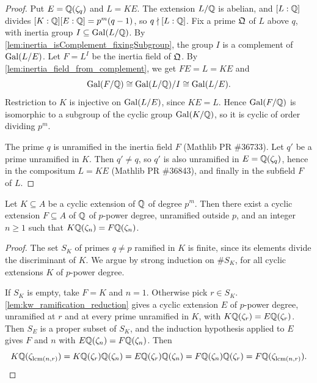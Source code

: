 \begin{proof}
  \leanok
  Put $E = \mathbb{Q}(\zeta_q)$ and $L = KE$. The extension $L/\mathbb{Q}$ is abelian, and $[L:\mathbb{Q}]$ divides
  $[K:\mathbb{Q}][E:\mathbb{Q}] = p^m(q-1)$, so $q \nmid [L:\mathbb{Q}]$. Fix a prime $\mathfrak{Q}$ of $L$ above $q$, with
  inertia group $I \subseteq \mathrm{Gal}(L/\mathbb{Q})$. By \ref{lem:inertia_isComplement_fixingSubgroup}, the
  group $I$ is a complement of $\mathrm{Gal}(L/E)$. Let $F = L^{I}$ be the inertia field of $\mathfrak{Q}$. By
  \ref{lem:inertia_field_from_complement}, we get $FE = L = KE$ and
  \[
    \mathrm{Gal}(F/\mathbb{Q}) \cong \mathrm{Gal}(L/\mathbb{Q})/I \cong \mathrm{Gal}(L/E).
  \]
  Restriction to $K$ is injective on $\mathrm{Gal}(L/E)$, since $KE = L$. Hence $\mathrm{Gal}(F/\mathbb{Q})$ is
  isomorphic to a subgroup of the cyclic group $\mathrm{Gal}(K/\mathbb{Q})$, so it is cyclic of order dividing
  $p^m$.

  The prime $q$ is unramified in the inertia field $F$ (Mathlib PR \#36733). Let $q'$ be a prime
  unramified in $K$. Then $q' \neq q$, so $q'$ is also unramified in $E = \mathbb{Q}(\zeta_q)$, hence in
  the compositum $L = KE$ (Mathlib PR \#36843), and finally in the subfield $F$ of $L$.
\end{proof}

\begin{lemma}
  \label{lem:kw_reduce_to_unramified_outside_p}
  \leanok
  Let $K \subseteq A$ be a cyclic extension of $\mathbb{Q}$ of degree $p^m$. Then there exist a cyclic
  extension $F \subseteq A$ of $\mathbb{Q}$ of $p$-power degree, unramified outside $p$, and an integer
  $n \geq 1$ such that $K\mathbb{Q}(\zeta_n) = F\mathbb{Q}(\zeta_n)$.
\end{lemma}

\begin{proof}
  \leanok
  The set $S_K$ of primes $q \neq p$ ramified in $K$ is finite, since its elements divide the
  discriminant of $K$. We argue by strong induction on $\#S_K$, for all cyclic extensions $K$ of
  $p$-power degree.

  If $S_K$ is empty, take $F = K$ and $n = 1$. Otherwise pick $r \in S_K$.
  \ref{lem:kw_ramification_reduction} gives a cyclic extension $E$ of $p$-power degree, unramified
  at $r$ and at every prime unramified in $K$, with $K\mathbb{Q}(\zeta_r) = E\mathbb{Q}(\zeta_r)$. Then $S_E$ is
  a proper subset of $S_K$, and the induction hypothesis applied to $E$ gives $F$ and $n$ with
  $E\mathbb{Q}(\zeta_n) = F\mathbb{Q}(\zeta_n)$. Then
  \[
    K\mathbb{Q}(\zeta_{\operatorname{lcm}(n,r)}) = K\mathbb{Q}(\zeta_r)\mathbb{Q}(\zeta_n)
      = E\mathbb{Q}(\zeta_r)\mathbb{Q}(\zeta_n) = F\mathbb{Q}(\zeta_n)\mathbb{Q}(\zeta_r)
      = F\mathbb{Q}(\zeta_{\operatorname{lcm}(n,r)}).
  \]
\end{proof}

